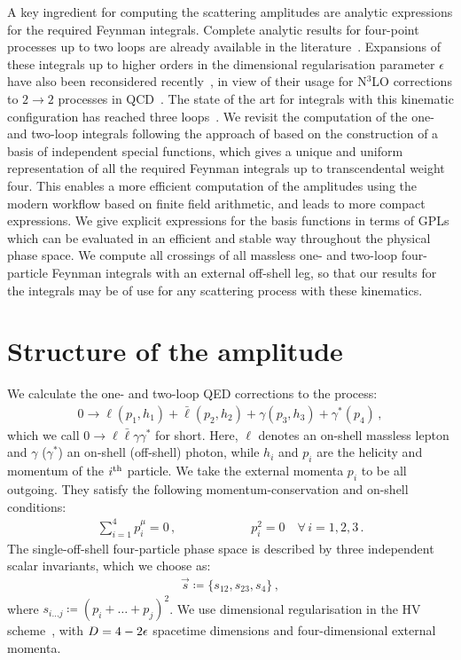 \documentclass[main.tex]{subfiles}
\begin{document}
A key ingredient for computing the scattering amplitudes are analytic
expressions for the required Feynman integrals.  Complete analytic results for four-point processes up
to two loops are already available in the
literature~\cite{gehrmann:2000zt,gehrmann:2001ck,Gehrmann:2002zr}.  Expansions
of these integrals up to higher orders in the dimensional regularisation
parameter $\epsilon$ have also been reconsidered
recently~\cite{Gehrmann:2023etk}, in view of their usage for N$^3$LO
corrections to $2\to 2$ processes in
QCD~\cite{Gehrmann:2022vuk,Gehrmann:2023zpz}.  The state of the art for
integrals with this kinematic configuration has reached three
loops~\cite{DiVita:2014pza,Canko:2020gqp,Canko:2021xmn,Henn:2023vbd}.  We
revisit the computation of the one- and two-loop integrals following the
approach of
based on the construction of a basis of independent special functions,
which gives a unique and uniform representation of all the required Feynman
integrals up to transcendental weight four.  This enables a more efficient
computation of the amplitudes using the modern workflow based on finite field
arithmetic, and leads to more compact expressions. We give explicit expressions
for the basis functions in terms of GPLs which can be evaluated in an
efficient and stable way throughout the physical phase space.  We compute all
crossings of all massless one- and two-loop four-particle Feynman integrals
with an external off-shell leg, so that our results for the integrals may be of
use for any scattering process with these kinematics.


\section{Structure of the amplitude}
\label{secQED:structure}

We calculate the one- and two-loop QED corrections to the process:
\begin{align}
    \label{eqQED:scatter}
    0 \to \ell(p_1,h_1) + \bar{\ell}(p_2,h_2) + \gamma(p_3,h_3) + \gamma^{*}(p_4) \,,
\end{align}
which we call $0\to \ell \bar\ell \gamma \gamma^*$ for short. 
Here, $\ell$ denotes an on-shell massless lepton and $\gamma$ ($\gamma^*$) an on-shell (off-shell) photon, while $h_i$ and $p_i$ are the helicity and momentum of the $i\textsuperscript{th}$ particle.
We take the external momenta $p_i$ to be all outgoing. They satisfy the following momentum-conservation and on-shell conditions:
\begin{align}
    \sum_{i=1}^{4} p_i^\mu = 0 \,, \qquad \qquad \qquad p_i^2 = 0 \quad \forall \, i=1,2,3\,.
\end{align}
The single-off-shell four-particle phase space is described by three independent scalar invariants, which we choose as:
\begin{align}
    \vec{s} \coloneqq \{s_{12}, s_{23}, s_4\} \,,
\end{align}
where $s_{i\ldots j} \coloneqq (p_i+\ldots+p_j)^2$.
We use dimensional regularisation in the HV scheme~\cite{Gnendiger:2017pys}, with $D=4-2\epsilon$ spacetime dimensions and four-dimensional external momenta.
\end{document}
